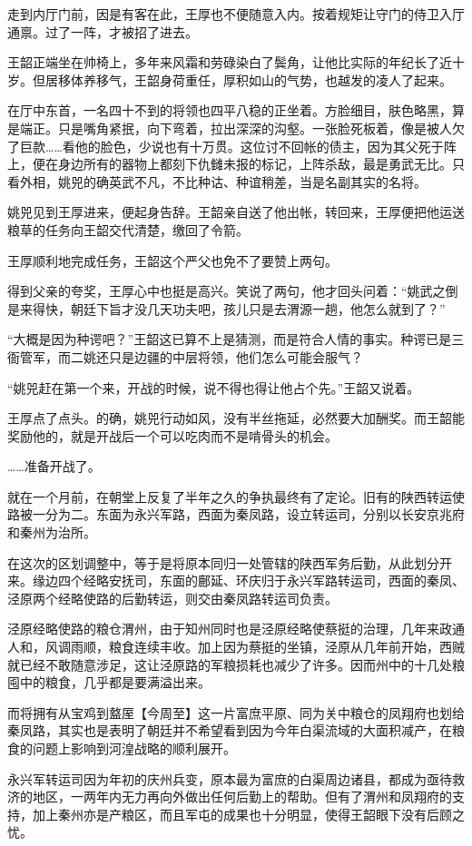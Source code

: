 走到内厅门前，因是有客在此，王厚也不便随意入内。按着规矩让守门的侍卫入厅通禀。过了一阵，才被招了进去。

王韶正端坐在帅椅上，多年来风霜和劳碌染白了鬓角，让他比实际的年纪长了近十岁。但居移体养移气，王韶身荷重任，厚积如山的气势，也越发的凌人了起来。

在厅中东首，一名四十不到的将领也四平八稳的正坐着。方脸细目，肤色略黑，算是端正。只是嘴角紧抿，向下弯着，拉出深深的沟壑。一张脸死板着，像是被人欠了巨款……看他的脸色，少说也有十万贯。这位讨不回帐的债主，因为其父死于阵上，便在身边所有的器物上都刻下仇雠未报的标记，上阵杀敌，最是勇武无比。只看外相，姚兕的确英武不凡，不比种诂、种谊稍差，当是名副其实的名将。

姚兕见到王厚进来，便起身告辞。王韶亲自送了他出帐，转回来，王厚便把他运送粮草的任务向王韶交代清楚，缴回了令箭。

王厚顺利地完成任务，王韶这个严父也免不了要赞上两句。

得到父亲的夸奖，王厚心中也挺是高兴。笑说了两句，他才回头问着：“姚武之倒是来得快，朝廷下旨才没几天功夫吧，孩儿只是去渭源一趟，他怎么就到了？”

“大概是因为种谔吧？”王韶这已算不上是猜测，而是符合人情的事实。种谔已是三衙管军，而二姚还只是边疆的中层将领，他们怎么可能会服气？

“姚兕赶在第一个来，开战的时候，说不得也得让他占个先。”王韶又说着。

王厚点了点头。的确，姚兕行动如风，没有半丝拖延，必然要大加酬奖。而王韶能奖励他的，就是开战后一个可以吃肉而不是啃骨头的机会。

……准备开战了。

就在一个月前，在朝堂上反复了半年之久的争执最终有了定论。旧有的陕西转运使路被一分为二。东面为永兴军路，西面为秦凤路，设立转运司，分别以长安京兆府和秦州为治所。

在这次的区划调整中，等于是将原本同归一处管辖的陕西军务后勤，从此划分开来。缘边四个经略安抚司，东面的鄜延、环庆归于永兴军路转运司，西面的秦凤、泾原两个经略使路的后勤转运，则交由秦凤路转运司负责。

泾原经略使路的粮仓渭州，由于知州同时也是泾原经略使蔡挺的治理，几年来政通人和，风调雨顺，粮食连续丰收。加上因为蔡挺的坐镇，泾原从几年前开始，西贼就已经不敢随意涉足，这让泾原路的军粮损耗也减少了许多。因而州中的十几处粮囤中的粮食，几乎都是要满溢出来。

而将拥有从宝鸡到盩厔【今周至】这一片富庶平原、同为关中粮仓的凤翔府也划给秦凤路，其实也是表明了朝廷并不希望看到因为今年白渠流域的大面积减产，在粮食的问题上影响到河湟战略的顺利展开。

永兴军转运司因为年初的庆州兵变，原本最为富庶的白渠周边诸县，都成为亟待救济的地区，一两年内无力再向外做出任何后勤上的帮助。但有了渭州和凤翔府的支持，加上秦州亦是产粮区，而且军屯的成果也十分明显，使得王韶眼下没有后顾之忧。

